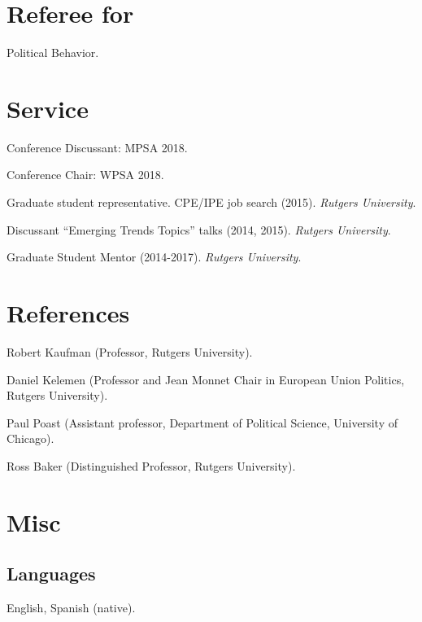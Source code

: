 \documentclass[letterpaper]{article}
\renewenvironment{itemize}{
  \begin{list}{}{
    \setlength{\leftmargin}{1.5em}
  }
}{
  \end{list}
}
\begin{document}
\section*{Referee for}
  \begin{itemize}
    \item[$\bullet$] Political Behavior.
  \end{itemize}

\section*{Service}

\begin{itemize}
\item[$\bullet$] Conference Discussant: MPSA 2018.
\item[$\bullet$] Conference Chair: WPSA 2018.
\item[$\bullet$] Graduate student representative. CPE/IPE job search (2015). \emph{Rutgers University}.
\item[$\bullet$] Discussant ``Emerging Trends Topics'' talks (2014, 2015). \emph{Rutgers University}.
\item[$\bullet$] Graduate Student Mentor (2014-2017). \emph{Rutgers University}.
\end{itemize}


\section*{References}
\begin{itemize}
\item[$\bullet$] Robert Kaufman {\scriptsize(Professor, Rutgers University).}
\item[$\bullet$] Daniel Kelemen {\scriptsize(Professor and Jean Monnet Chair in
European Union Politics, Rutgers University).}
\item[$\bullet$] Paul Poast {\scriptsize(Assistant professor, Department of Political Science, University of Chicago).}
\item[$\bullet$] Ross Baker {\scriptsize(Distinguished Professor, Rutgers University).}
\end{itemize}


\section*{Misc}

\subsection*{Languages}
English, Spanish (native).
\end{document}
